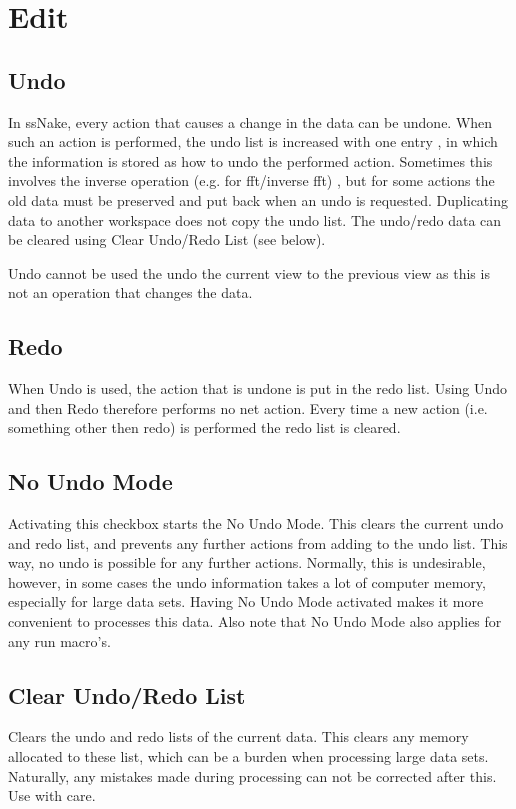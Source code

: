 \documentclass[11pt,a4paper]{article}
\begin{document}
\section{Edit}
\subsection{Undo}
In ssNake, every action that causes a change in the data can be undone. When such an action is performed, the undo list is increased with one entry
, in which the information is stored as how to undo the performed action. Sometimes this involves the inverse operation (e.g. for fft/inverse fft)
, but for some actions the old data must be preserved and put back when an undo is requested. Duplicating data to another workspace does not copy
the undo list. The undo/redo data can be cleared using Clear Undo/Redo List (see below).

Undo cannot be used the undo the current view to the previous view as this is not an operation that changes the data.

\subsection{Redo}
When Undo is used, the action that is undone is put in the redo list. Using Undo and then Redo therefore performs no net action.
Every time a new action (i.e. something other then redo) is performed the redo list is cleared.

\subsection{No Undo Mode}
Activating this checkbox starts the No Undo Mode. This clears the current undo and redo list, and prevents any further actions from adding to the undo list. This way, no undo is possible
for any further actions. Normally, this is undesirable, however, in some cases the undo information takes a lot of computer memory, especially for large data sets.
Having No Undo Mode activated makes it more convenient to processes this data. Also note that No Undo Mode also applies for any run macro's.

\subsection{Clear Undo/Redo List}
Clears the undo and redo lists of the current data. This clears any memory allocated to these list, which can be a burden when processing large data sets.
Naturally, any mistakes made during processing can not be corrected after this. Use with care.
\end{document}
